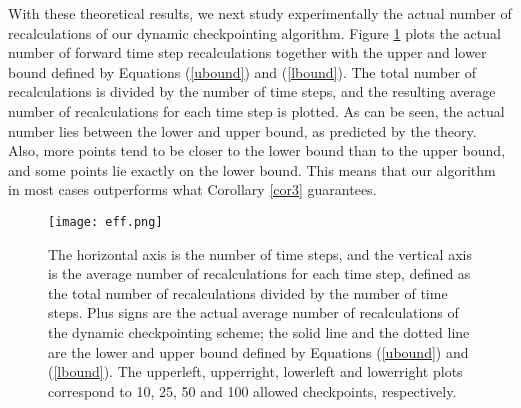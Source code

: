 \documentclass[oneeqnum, onethmnum, onefignum, onetabnum]{siamltex}
\begin{document}
With these theoretical results, we next study experimentally the actual
number of recalculations of our dynamic checkpointing algorithm.
Figure \ref{fig_eff} plots the actual number of forward time step
recalculations together with the upper and lower bound defined by Equations
(\ref{ubound}) and (\ref{lbound}).  The total number of recalculations
is divided by the number of time steps, and the resulting average number of
recalculations for each time step is plotted.  As can be seen, the actual
number lies between the lower and upper bound, as predicted by the theory.
Also, more points tend to be closer to the lower bound than to the upper
bound, and some points lie exactly on the lower bound.  This means that our
algorithm in most cases outperforms what Corollary \ref{cor3} guarantees.
\begin{figure}[htp] \center
\texttt{[image: eff.png]}
\caption{The horizontal axis is the number of time steps, and the
vertical axis is the average
number of recalculations for each time step,
defined as the total number of recalculations divided by the number
of time steps.  Plus signs are the actual average number of recalculations
of the dynamic checkpointing scheme; the solid line and the dotted line are the
lower and upper bound defined by Equations (\ref{ubound}) and (\ref{lbound}).
The upperleft, upperright, lowerleft and lowerright plots correspond to
10, 25, 50 and 100 allowed checkpoints, respectively.}
\label{fig_eff} 
\end{figure}
\end{document}
